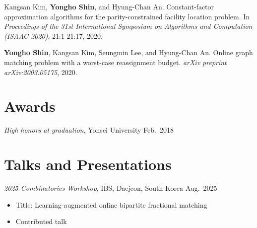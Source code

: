 \documentclass{article}
\newcommand{\killinitspace}{-0.7em}
\begin{document}
Kangsan Kim, \textbf{Yongho Shin}, and Hyung-Chan An. Constant-factor approximation algorithms for the parity-constrained facility location problem. In \emph{Proceedings of the 31st International Symposium on Algorithms and Computation (ISAAC 2020)}, 21:1-21:17, 2020.

\textbf{Yongho Shin}, Kangsan Kim, Seungmin Lee, and Hyung-Chan An. Online graph matching problem with a worst-case reassignment budget. \emph{arXiv preprint arXiv:2003.05175}, 2020.

\section{Awards}
\textsl{High honors at graduation}, Yonsei University \hfill Feb.~2018

\section{Talks and Presentations}
\textsl{2025 Combinatorics Workshop}, IBS, Daejeon, South Korea \hfill Aug.~2025
\vspace{\killinitspace}
\begin{itemize}
\item Title: Learning-augmented online bipartite fractional matching
\item Contributed talk
\end{itemize}
\end{document}

